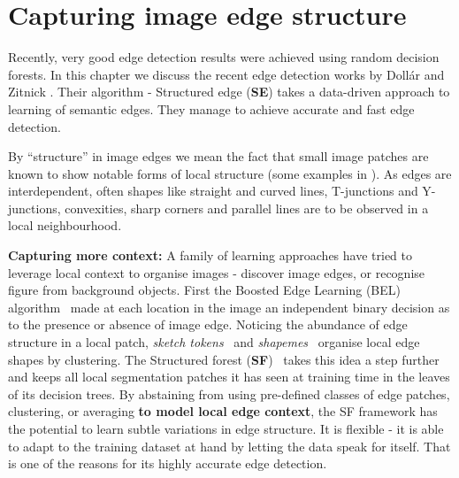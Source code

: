 \chapter{Capturing image edge structure} %
\label{Chapter2}
Recently, very good edge detection results were achieved using random decision forests. In this chapter we discuss the recent edge detection works by Doll\'ar and Zitnick \cite{DollarICCV13edges,Dollar2015PAMI}. Their algorithm - Structured edge ({\bf SE}) takes a data-driven approach to learning of semantic edges. %
They manage to achieve accurate and fast edge detection. %

By ``structure'' in image edges %
we mean the fact that small %
image patches are known \cite{Ren2006figure,LimZD13} to show %
notable %
forms of local structure (some examples in ). As edges are interdependent, often shapes like straight and curved lines, T-junctions and Y-junctions, convexities, sharp corners and parallel lines are to be observed in a local neighbourhood.

\textbf{Capturing more context:} A family of learning approaches have tried to leverage local context to organise images - discover image edges, or recognise %
figure from background objects. First the Boosted Edge Learning (BEL) algorithm~\cite{Dollar2006supervised} made at each location in the image an independent binary decision as to the presence or absence of image edge. Noticing the abundance of edge structure in a local patch, \textit{sketch tokens}~\cite{LimZD13} and \textit{shapemes}~\cite{Ren2006figure} organise local edge shapes by clustering. 
The Structured forest ({\bf SF})~\cite{DollarICCV13edges} takes this idea a step further and keeps all local segmentation patches it has seen at training time in the leaves of its decision trees. By abstaining from using pre-defined classes of edge patches, clustering, or averaging \textbf{to model local edge context}, the SF framework has the potential to learn subtle variations in edge structure. It is flexible - it is able to adapt to the training dataset at hand by letting the data speak for itself. That is one of the reasons for its highly accurate edge detection.

